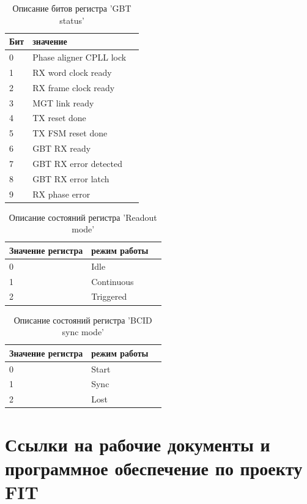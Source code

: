 \documentclass{article}
\begin{document}
\begin{table}[H]
\centering
\begin{tabular}{| l | l | l |}
\hline
Бит & значение \\ \hline
0 & Phase aligner CPLL lock \\ \hline
1 & RX word clock ready \\ \hline
2 & RX frame clock ready \\ \hline
3 & MGT link ready \\ \hline
4 & TX reset done \\ \hline
5 & TX FSM reset done \\ \hline
6 & GBT RX ready \\ \hline
7 & GBT RX error detected \\ \hline
8 & GBT RX error latch \\ \hline
9 & RX phase error \\ \hline
\end{tabular}
\caption{Описание битов регистра 'GBT status'\label{tab10}}
\end{table}




\begin{table}[H]
\centering
\begin{tabular}{| l | l | l |}
\hline
Значение регистра & режим работы \\ \hline
0 & Idle \\ \hline
1 & Continuous \\ \hline
2 & Triggered \\ \hline
\end{tabular}
\caption{Описание состояний регистра 'Readout mode'\label{tab11}}
\end{table}



\begin{table}[H]
\centering
\begin{tabular}{| l | l | l |}
\hline
Значение регистра & режим работы \\ \hline
0 & Start \\ \hline
1 & Sync \\ \hline
2 & Lost \\ \hline
\end{tabular}
\caption{Описание состояний регистра 'BCID sync mode'\label{tab12}}
\end{table}



\section{Ссылки на рабочие документы и программное обеспечение по проекту FIT}
\end{document}
